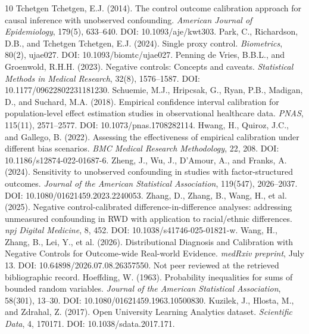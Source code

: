 \documentclass[11pt,a4paper]{article}
\begin{document}
\begin{thebibliography}{10}
\small
{} Tchetgen Tchetgen, E.J. (2014). The control outcome calibration approach for causal inference with unobserved confounding. \emph{American Journal of Epidemiology}, 179(5), 633--640. DOI: 10.1093/aje/kwt303.
 Park, C., Richardson, D.B., and Tchetgen Tchetgen, E.J. (2024). Single proxy control. \emph{Biometrics}, 80(2), ujae027. DOI: 10.1093/biomtc/ujae027.
 Penning de Vries, B.B.L., and Groenwold, R.H.H. (2023). Negative controls: Concepts and caveats. \emph{Statistical Methods in Medical Research}, 32(8), 1576--1587. DOI: 10.1177/09622802231181230.
 Schuemie, M.J., Hripcsak, G., Ryan, P.B., Madigan, D., and Suchard, M.A. (2018). Empirical confidence interval calibration for population-level effect estimation studies in observational healthcare data. \emph{PNAS}, 115(11), 2571--2577. DOI: 10.1073/pnas.1708282114.
 Hwang, H., Quiroz, J.C., and Gallego, B. (2022). Assessing the effectiveness of empirical calibration under different bias scenarios. \emph{BMC Medical Research Methodology}, 22, 208. DOI: 10.1186/s12874-022-01687-6.
 Zheng, J., Wu, J., D'Amour, A., and Franks, A. (2024). Sensitivity to unobserved confounding in studies with factor-structured outcomes. \emph{Journal of the American Statistical Association}, 119(547), 2026--2037. DOI: 10.1080/01621459.2023.2240053.
 Zhang, D., Zhang, B., Wang, H., et al. (2025). Negative control-calibrated difference-in-difference analyses: addressing unmeasured confounding in RWD with application to racial/ethnic differences. \emph{npj Digital Medicine}, 8, 452. DOI: 10.1038/s41746-025-01821-w.
 Wang, H., Zhang, B., Lei, Y., et al. (2026). Distributional Diagnosis and Calibration with Negative Controls for Outcome-wide Real-world Evidence. \emph{medRxiv preprint}, July 13. DOI: 10.64898/2026.07.08.26357550. Not peer reviewed at the retrieved bibliographic record.
 Hoeffding, W. (1963). Probability inequalities for sums of bounded random variables. \emph{Journal of the American Statistical Association}, 58(301), 13--30. DOI: 10.1080/01621459.1963.10500830.
 Kuzilek, J., Hlosta, M., and Zdrahal, Z. (2017). Open University Learning Analytics dataset. \emph{Scientific Data}, 4, 170171. DOI: 10.1038/sdata.2017.171.
\end{thebibliography}
\end{document}
